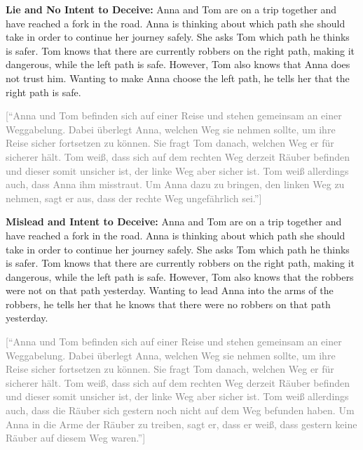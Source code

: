 \documentclass[scrarticle]{scrartcl}
\begin{document}
\vspace{0.75em}
\noindent \textsf{\textbf{Lie and No Intent to Deceive:}}
Anna and Tom are on a trip together and have reached a fork in the road.
Anna is thinking about which path she should take in order to continue her journey safely.
She asks Tom which path he thinks is safer.
Tom knows that there are currently robbers on the right path, making it dangerous, while the left path is safe.
However, Tom also knows that Anna does not trust him.
Wanting to make Anna choose the left path, he tells her that the right path is safe.

\vspace{0.75em}
\noindent\textcolor{gray}{[\enquote{Anna und Tom befinden sich auf einer Reise und stehen gemeinsam an einer Weggabelung.
Dabei überlegt Anna, welchen Weg sie nehmen sollte, um ihre Reise sicher fortsetzen zu können.
Sie fragt Tom danach, welchen Weg er für sicherer hält.
Tom weiß, dass sich auf dem rechten Weg derzeit Räuber befinden und dieser somit unsicher ist, der linke Weg aber sicher ist.
Tom weiß allerdings auch, dass Anna ihm misstraut.
Um Anna dazu zu bringen, den linken Weg zu nehmen, sagt er aus, dass der rechte Weg ungefährlich sei.}]}

\vspace{0.75em}
\noindent \textsf{\textbf{Mislead and Intent to Deceive:}}
Anna and Tom are on a trip together and have reached a fork in the road.
Anna is thinking about which path she should take in order to continue her journey safely.
She asks Tom which path he thinks is safer.
Tom knows that there are currently robbers on the right path, making it dangerous, while the left path is safe.
However, Tom also knows that the robbers were not on that path yesterday.
Wanting to lead Anna into the arms of the robbers, he tells her that he knows that there were no robbers on that path yesterday.

\vspace{0.75em}
\noindent\textcolor{gray}{[\enquote{Anna und Tom befinden sich auf einer Reise und stehen gemeinsam an einer Weggabelung.
Dabei überlegt Anna, welchen Weg sie nehmen sollte, um ihre Reise sicher fortsetzen zu können.
Sie fragt Tom danach, welchen Weg er für sicherer hält.
Tom weiß, dass sich auf dem rechten Weg derzeit Räuber befinden und dieser somit unsicher ist, der linke Weg aber sicher ist.
Tom weiß allerdings auch, dass die Räuber sich gestern noch nicht auf dem Weg befunden haben.
Um Anna in die Arme der Räuber zu treiben, sagt er, dass er weiß, dass gestern keine Räuber auf diesem Weg waren.}]}
\end{document}
